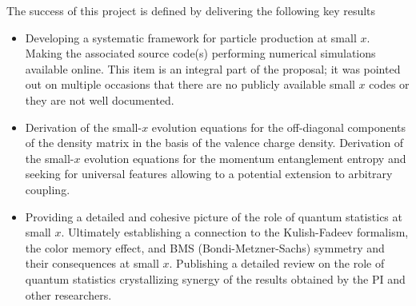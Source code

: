 The success of this project is defined by delivering the following key results 
\begin{itemize}
    \item Developing a systematic framework for particle production at 
		small $x$. Making the associated source code(s) performing numerical simulations available online. 
		This item is an integral part 
		of the proposal; it was pointed out on multiple occasions that 
		there are no publicly available small $x$ codes or they are not well 
		documented. 
    \item Derivation of the 
		small-$x$ evolution equations for the off-diagonal components 
		of the density matrix in the basis of the valence charge density.
		Derivation of the small-$x$ evolution equations for the momentum 
		entanglement entropy and seeking for universal features allowing to 
		a potential extension to arbitrary coupling.  
    \item Providing a detailed and cohesive picture of the role of 
		quantum statistics at small $x$. Ultimately establishing 
		a connection to 
		the Kulish-Fadeev formalism, the color memory effect, and 
		BMS (Bondi-Metzner-Sachs) symmetry and their consequences at small $x$.   
		Publishing a detailed review on the role of quantum statistics 
		crystallizing synergy of the results obtained by the PI and 
		other researchers. 
\end{itemize}
